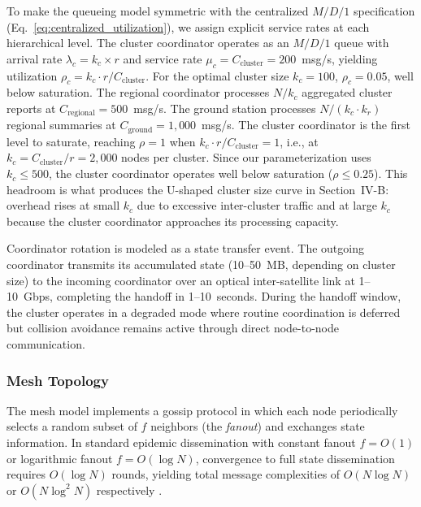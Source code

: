 \documentclass[journal]{IEEEtran}
\begin{document}
To make the queueing model symmetric with the centralized $M/D/1$ specification (Eq.~\ref{eq:centralized_utilization}), we assign explicit service rates at each hierarchical level. The cluster coordinator operates as an $M/D/1$ queue with arrival rate $\lambda_c = k_c \times r$ and service rate $\mu_c = C_{\text{cluster}} = 200$~msg/s, yielding utilization $\rho_c = k_c \cdot r / C_{\text{cluster}}$. For the optimal cluster size $k_c = 100$, $\rho_c = 0.05$, well below saturation. The regional coordinator processes $N/k_c$ aggregated cluster reports at $C_{\text{regional}} = 500$~msg/s. The ground station processes $N/(k_c \cdot k_r)$ regional summaries at $C_{\text{ground}} = 1{,}000$~msg/s. The cluster coordinator is the first level to saturate, reaching $\rho = 1$ when $k_c \cdot r / C_{\text{cluster}} = 1$, i.e., at $k_c = C_{\text{cluster}} / r = 2{,}000$ nodes per cluster. Since our parameterization uses $k_c \leq 500$, the cluster coordinator operates well below saturation ($\rho \leq 0.25$). This headroom is what produces the U-shaped cluster size curve in Section~IV-B: overhead rises at small $k_c$ due to excessive inter-cluster traffic and at large $k_c$ because the cluster coordinator approaches its processing capacity.

Coordinator rotation is modeled as a state transfer event. The outgoing coordinator transmits its accumulated state (10--50~MB, depending on cluster size) to the incoming coordinator over an optical inter-satellite link at 1--10~Gbps, completing the handoff in 1--10~seconds. During the handoff window, the cluster operates in a degraded mode where routine coordination is deferred but collision avoidance remains active through direct node-to-node communication.

\subsubsection{Mesh Topology}

The mesh model implements a gossip protocol in which each node periodically selects a random subset of $f$ neighbors (the \emph{fanout}) and exchanges state information. In standard epidemic dissemination with constant fanout $f = O(1)$ or logarithmic fanout $f = O(\log N)$, convergence to full state dissemination requires $O(\log N)$ rounds, yielding total message complexities of $O(N \log N)$ or $O(N \log^2 N)$ respectively \cite{demers_gossip}.
\end{document}
